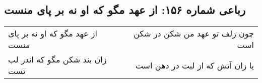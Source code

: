 \begin{center}
\section*{رباعی شماره ۱۵۶: از عهد مگو که او نه بر پای منست}
\label{sec:0156}
\begin{longtable}{l p{0.5cm} r}
از عهد مگو که او نه بر پای منست
&&
چون زلف تو عهد من شکن در شکن است
\\
زان بند شکن مگو که اندر لب تست
&&
یا زان آتش که از لبت در دهن است
\\
\end{longtable}
\end{center}
